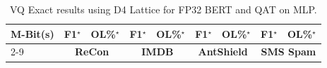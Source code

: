 \documentclass{article}
\theoremstyle{definition}
\theoremstyle{remark}
\begin{document}
\begin{table}[h]
\scriptsize
    \caption{VQ Exact results using D4 Lattice for FP32 BERT and QAT on MLP.}
    \label{tab:d4MLP}
    \begin{tabular}{|p{1.2cm}|p{1.2cm}|p{1cm}|p{1.2cm}|p{1cm}|p{1.2cm}|p{1cm}|p{1.2cm}|p{1cm}|} \hline
    
       \multirow{2}{*}{\textbf{M-Bit(s)}}  &  \textbf{F1}$^{\star}$ & \textbf{OL\%}$^{\star}$ &  \textbf{F1}$^{\star}$ & \textbf{OL\%}$^{\star}$ &  \textbf{F1}$^{\star}$ & \textbf{OL\%}$^{\star}$ &  \textbf{F1}$^{\star}$ & \textbf{OL\%}$^{\star}$ \\ \cline{2-9}
       \rowcolor{black!20}
         & \multicolumn{2}{|c|}{\textbf{ReCon}} & \multicolumn{2}{|c|}{\textbf{IMDB}} & \multicolumn{2}{|c|}{\textbf{AntShield}} & \multicolumn{2}{|c|}{\textbf{SMS Spam}} \\ \hline

\end{tabular}
\end{table}
\end{document}
